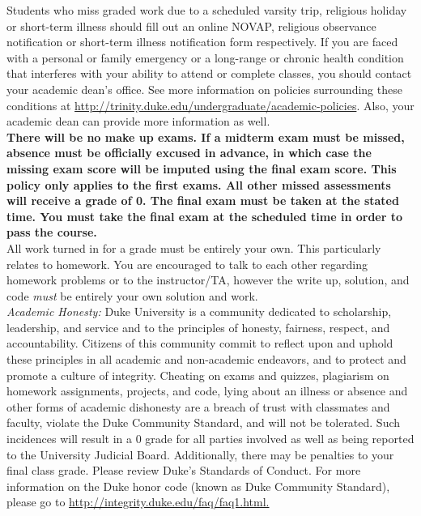 \documentclass[11pt]{article}
\begin{document}
Students who miss graded work due to a scheduled varsity trip, religious holiday or short-term illness should fill out an online NOVAP, religious observance notification or short-term illness notification form respectively. If you are faced with a personal or family emergency or a long-range or chronic health condition that interferes with your ability to attend or complete classes, you should contact your academic dean's office. See more information on policies surrounding these conditions at \url{http://trinity.duke.edu/undergraduate/academic-policies}. Also, your academic dean can provide more information as well.\\

\textbf{There will be no make up exams. If a midterm exam must be missed, absence must be officially excused in advance, in which case the missing exam score will be imputed using the final exam score. This policy only applies to the first  exams. All other missed assessments will receive a grade of 0. The final exam must be taken at the stated time. You must take the final exam at the scheduled time in order to pass the course.}\\

 All work turned in for a grade must be entirely your own. This particularly relates to homework. You are encouraged to talk to each other regarding homework problems or to the instructor/TA, however the write up, solution, and code \emph{must} be entirely your own solution and work. \\


\emph{Academic Honesty:} Duke University is a community dedicated to scholarship, leadership, and service and to the principles of honesty, fairness, respect, and accountability. Citizens of this community commit to reflect upon and uphold these principles in all academic and non-academic endeavors, and to protect and promote a culture of integrity. Cheating on exams and quizzes, plagiarism on homework assignments, projects, and code, lying about an illness or absence and other forms of academic dishonesty are a breach of trust with classmates and faculty, violate the Duke Community Standard, and will not be tolerated. Such incidences will result in a 0 grade for all parties involved as well as being reported to the University Judicial Board. Additionally, there may be penalties to your final class grade. Please review Duke's Standards of Conduct.
For more information on the Duke honor code (known as Duke Community Standard), please go to \url{http://integrity.duke.edu/faq/faq1.html.}\\
\end{document}
